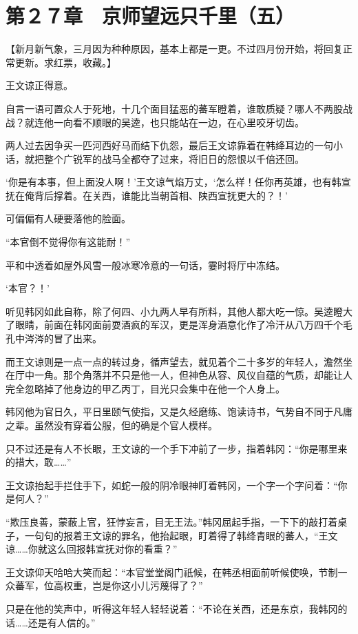 \section{第２７章　京师望远只千里（五）}

【新月新气象，三月因为种种原因，基本上都是一更。不过四月份开始，将回复正常更新。求红票，收藏。】

王文谅正得意。

自言一语可置众人于死地，十几个面目猛恶的蕃军瞪着，谁敢质疑？哪人不两股战战？就连他一向看不顺眼的吴逵，也只能站在一边，在心里咬牙切齿。

两人过去因争买一匹河西好马而结下仇怨，最后王文谅靠着在韩绛耳边的一句小话，就把整个广锐军的战马全都夺了过来，将旧日的怨恨以千倍还回。

‘你是有本事，但上面没人啊！’王文谅气焰万丈，‘怎么样！任你再英雄，也有韩宣抚在俺背后撑着。在关西，谁能比当朝首相、陕西宣抚更大的？！’

可偏偏有人硬要落他的脸面。

“本官倒不觉得你有这能耐！”

平和中透着如屋外风雪一般冰寒冷意的一句话，霎时将厅中冻结。

‘本官？！’

听见韩冈如此自称，除了何四、小九两人早有所料，其他人都大吃一惊。吴逵瞪大了眼睛，前面在韩冈面前耍酒疯的军汉，更是浑身酒意化作了冷汗从八万四千个毛孔中涔涔的冒了出来。

而王文谅则是一点一点的转过身，循声望去，就见着个二十多岁的年轻人，澹然坐在厅中一角。那个角落并不只是他一人，但神色从容、风仪自蕴的气质，却能让人完全忽略掉了他身边的甲乙丙丁，目光只会集中在他一个人身上。

韩冈他为官日久，平日里颐气使指，又是久经磨练、饱读诗书，气势自不同于凡庸之辈。虽然没有穿着公服，但的确是个官人模样。

只不过还是有人不长眼，王文谅的一个手下冲前了一步，指着韩冈：“你是哪里来的措大，敢……”

王文谅抬起手拦住手下，如蛇一般的阴冷眼神盯着韩冈，一个字一个字问着：“你是何人？”

“欺压良善，蒙蔽上官，狂悖妄言，目无王法。”韩冈屈起手指，一下下的敲打着桌子，一句句的报着王文谅的罪名，他抬起眼，盯着得了韩绛青眼的蕃人，“王文谅……你就这么回报韩宣抚对你的看重？”

王文谅仰天哈哈大笑而起：“本官堂堂阁门祇候，在韩丞相面前听候使唤，节制一众蕃军，位高权重，岂是你这小儿污蔑得了？”

只是在他的笑声中，听得这年轻人轻轻说着：“不论在关西，还是东京，我韩冈的话……还是有人信的。”

